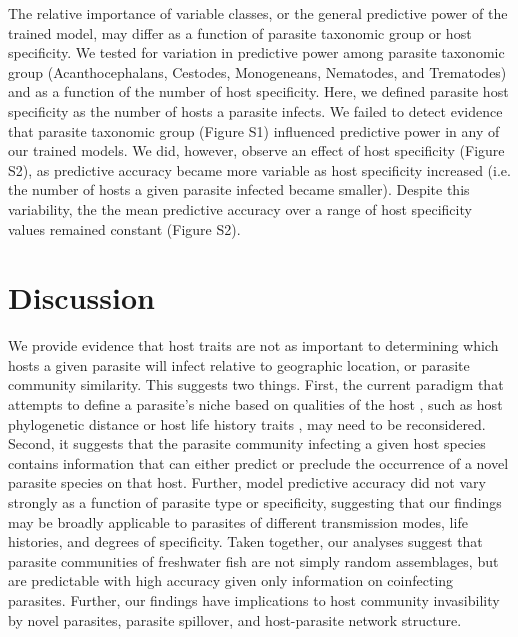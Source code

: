 \documentclass[12pt]{article}
\begin{document}
  The relative importance of variable classes, or the general predictive power of the trained model, may differ as a function of parasite taxonomic group or host specificity. We tested for variation in predictive power among parasite taxonomic group (Acanthocephalans, Cestodes, Monogeneans, Nematodes, and Trematodes) and as a function of the number of host specificity. Here, we defined parasite host specificity as the number of hosts a parasite infects. We failed to detect evidence that parasite taxonomic group (Figure S1) influenced predictive power in any of our trained models. We did, however, observe an effect of host specificity (Figure S2), as predictive accuracy became more variable as host specificity increased (i.e. the number of hosts a given parasite infected became smaller). Despite this variability, the the mean predictive accuracy over a range of host specificity values remained constant (Figure S2).  
  
  
  
\section*{Discussion}

 We provide evidence that host traits are not as important to determining which hosts a given parasite will infect relative to geographic location, or parasite community similarity. This suggests two things. First, the current paradigm that attempts to define a parasite's niche based on qualities of the host \citep{bush2001, poulin2011}, such as host phylogenetic distance \citep{adamson1994} or host life history traits \citep{sasal1999}, may need to be reconsidered. Second, it suggests that the parasite community infecting a given host species contains information that can either predict or preclude the occurrence of a novel parasite species on that host. Further, model predictive accuracy did not vary strongly as a function of parasite type or specificity, suggesting that our findings may be broadly applicable to parasites of different transmission modes, life histories, and degrees of specificity. Taken together, our analyses suggest that parasite communities of freshwater fish are not simply random assemblages, but are predictable with high accuracy given only information on coinfecting parasites. Further, our findings have implications to host community invasibility by novel parasites, parasite spillover, and host-parasite network structure. \\
 
\end{document}

